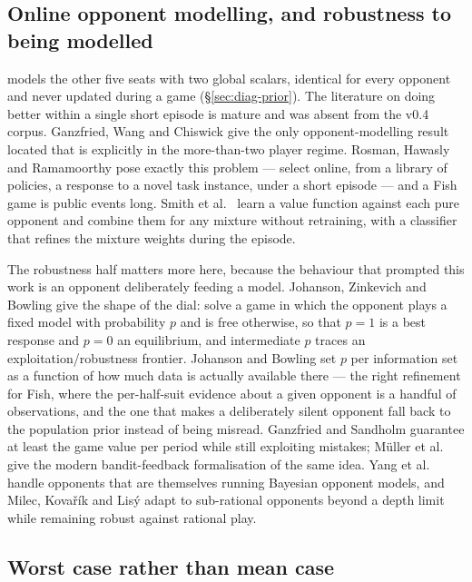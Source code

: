 \subsection{Online opponent modelling, and robustness to being modelled}
\label{sec:related-opponent}

\vfour{} models the other five seats with two global scalars, identical for every
opponent and never updated during a game (\S\ref{sec:diag-prior}). The literature
on doing better within a single short episode is mature and was absent from the
v0.4 corpus. Ganzfried, Wang and Chiswick \cite{ganzfried-multiplayer} give the
only opponent-modelling result located that is explicitly in the more-than-two
player regime. Rosman, Hawasly and Ramamoorthy \cite{rosman-bpr} pose exactly
this problem --- select online, from a library of policies, a response to a novel
task instance, under a short episode --- and a Fish game is
\numMirrorEvents{} public events long. Smith et al.\ \cite{smith-qmixing} learn a
value function against each pure opponent and combine them for any mixture
without retraining, with a classifier that refines the mixture weights during the
episode.

The robustness half matters more here, because the behaviour that prompted this
work is an opponent deliberately feeding a model. Johanson, Zinkevich and Bowling
\cite{johanson-rnash} give the shape of the dial: solve a game in which the
opponent plays a fixed model with probability $p$ and is free otherwise, so that
$p=1$ is a best response and $p=0$ an equilibrium, and intermediate $p$ traces an
exploitation/robustness frontier. Johanson and Bowling \cite{johanson-dbr} set
$p$ per information set as a function of how much data is actually available
there --- the right refinement for Fish, where the per-half-suit evidence about a
given opponent is a handful of observations, and the one that makes a
deliberately silent opponent fall back to the population prior instead of being
misread. Ganzfried and Sandholm \cite{ganzfried-safe} guarantee at least the game
value per period while still exploiting mistakes; M\"uller et al.\
\cite{muller-bestofboth} give the modern bandit-feedback formalisation of the
same idea. Yang et al.\ \cite{yang-bayestomop} handle opponents that are
themselves running Bayesian opponent models, and Milec, Kova\v{r}\'ik and Lis\'y
\cite{milec-abd} adapt to sub-rational opponents beyond a depth limit while
remaining robust against rational play.

\subsection{Worst case rather than mean case}
\label{sec:related-worstcase}

